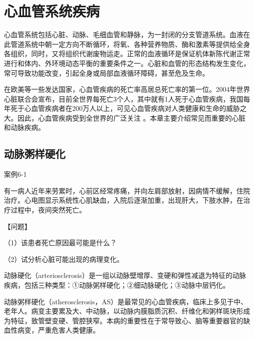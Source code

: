 \chapter{心血管系统疾病}


心血管系统包括心脏、动脉、毛细血管和静脉，为一封闭的分支管道系统。血液在此管道系统中朝一定方向不断循环，将氧、各种营养物质、酶和激素等提供给全身各组织，同时，又将组织代谢废物运走。正常的血液循环是保证机体新陈代谢正常进行和体内、外环境动态平衡的重要条件之一。心脏和血管的形态结构发生变化，常可导致功能改变，引起全身或局部血液循环障碍，甚至危及生命。

在欧美等一些发达国家，心血管疾病的死亡率高居总死亡率的第一位。2004年世界心脏联合会宣布，目前全世界每死亡3个人，其中就有1人死于心血管疾病，我国每年死于心血管疾病者在200万人以上，可见心血管疾病对人类健康和生命的威胁之大。因此，心血管疾病受到全世界的广泛关注
。本章主要介绍常见而重要的心脏和动脉疾病。

\section{动脉粥样硬化}
\begin{framed}
    {案例6-1}

    有一病人近年来劳累时，心前区经常疼痛，并向左肩部放射，因病情不缓解，住院治疗。心电图显示系统性心肌缺血，入院后逐渐加重，出现肝大，下肢水肿，在治疗过程中，夜间突然死亡。

    {【问题】}

    （1）该患者死亡原因最可能是什么？

    （2）试分析心脏可能出现的病理变化。
\end{framed}

动脉硬化（arteriosclerosis）是一组以动脉壁增厚、变硬和弹性减退为特征的动脉疾病，包括三种类型：①动脉粥样硬化；②细动脉硬化；③动脉中层钙化。

动脉粥样硬化（atherosclerosis，AS）是最常见的心血管疾病，临床上多见于中、老年人。病变主要累及大、中动脉，以动脉内膜脂质沉积、纤维化和粥样斑块形成为特征，致管壁变硬、管腔狭窄。本病的重要性在于常导致心、脑等重要器官的缺血性病变，严重危害人类健康。


